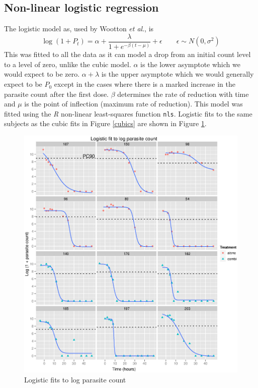 \subsection{Non-linear logistic regression}
The logistic model as, used by Wootton \textit{et al}.\cite{wootton}, is
$$\log(1+P_t)=\alpha+\frac{\lambda}{1+e^{-\beta(t-\mu)}}+\epsilon\quad\quad\epsilon\sim N(0,\sigma^2)$$
This was fitted to all the data as it can model a drop from an initial count level to a level of zero, unlike the cubic model. $\alpha$ is the lower asymptote which we would expect to be zero. $\alpha+\lambda$ is the upper asymptote which we would generally expect to be $P_0$ except in the cases where there is a marked increase in the parasite count after the first dose. $\beta$ determines the rate of reduction with time and $\mu$ is the point of inflection (maximum rate of reduction). This model was fitted using the \emph{R} non-linear least-squares function \texttt{nls}\cite{R}. Logistic fits to the same subjects as the cubic fits in Figure \ref{cubics} are shown in Figure \ref{logistics}.
\begin{figure}[p]
\includegraphics[width=6.5in]{logistics.eps} 
\caption{Logistic fits to log parasite count}\label{logistics}
\end{figure}

